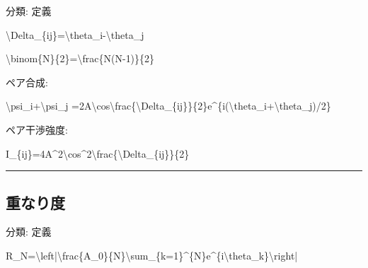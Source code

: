 \documentclass[
  a4paper]{ltjsarticle}
\newenvironment{Shaded}{}{}
\newcommand{\NormalTok}[1]{#1}
\begin{document}
分類: 定義

\begin{Shaded}
\begin{Highlighting}[]
\NormalTok{\textbackslash{}Delta\_\{ij\}=\textbackslash{}theta\_i{-}\textbackslash{}theta\_j}
\end{Highlighting}
\end{Shaded}

\begin{Shaded}
\begin{Highlighting}[]
\NormalTok{\textbackslash{}binom\{N\}\{2\}=\textbackslash{}frac\{N(N{-}1)\}\{2\}}
\end{Highlighting}
\end{Shaded}

ペア合成:

\begin{Shaded}
\begin{Highlighting}[]
\NormalTok{\textbackslash{}psi\_i+\textbackslash{}psi\_j}
\NormalTok{=2A\textbackslash{}cos\textbackslash{}frac\{\textbackslash{}Delta\_\{ij\}\}\{2\}e\^{}\{i(\textbackslash{}theta\_i+\textbackslash{}theta\_j)/2\}}
\end{Highlighting}
\end{Shaded}

ペア干渉強度:

\begin{Shaded}
\begin{Highlighting}[]
\NormalTok{I\_\{ij\}=4A\^{}2\textbackslash{}cos\^{}2\textbackslash{}frac\{\textbackslash{}Delta\_\{ij\}\}\{2\}}
\end{Highlighting}
\end{Shaded}

\begin{center}\rule{0.5\linewidth}{0.5pt}\end{center}

\subsection{重なり度}\label{ux91cdux306aux308aux5ea6}

分類: 定義

\begin{Shaded}
\begin{Highlighting}[]
\NormalTok{R\_N=\textbackslash{}left|\textbackslash{}frac\{A\_0\}\{N\}\textbackslash{}sum\_\{k=1\}\^{}\{N\}e\^{}\{i\textbackslash{}theta\_k\}\textbackslash{}right|}
\end{Highlighting}
\end{Shaded}
\end{document}
